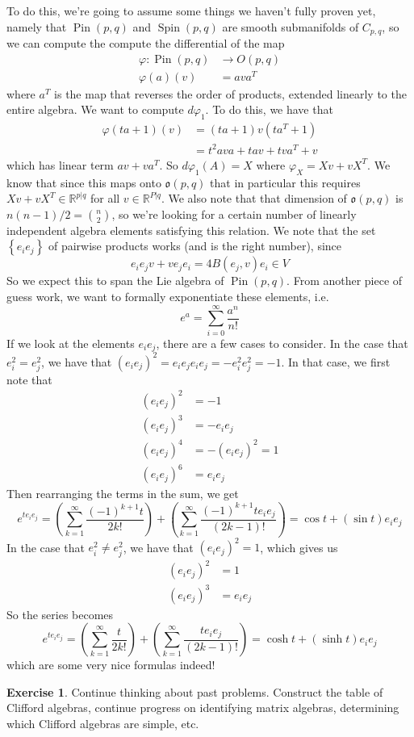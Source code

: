 \documentclass[psamsfonts]{amsart}
\theoremstyle{definition}
\newtheorem{exer}[thm]{Exercise}
\theoremstyle{remark}
\newcommand{\R}{\mathbb{R}}
\newcommand{\set}[1]{\left\lbrace #1 \right\rbrace}
\DeclareMathOperator{\Pin}{Pin}
\DeclareMathOperator{\Spin}{Spin}
\begin{document}
To do this, we're going to assume some things we haven't fully proven yet, namely that $\Pin(p,q)$ and $\Spin(p,q)$ are smooth submanifolds of $C_{p,q}$, so we can compute the compute the differential of the map
\begin{align*}
\varphi : \Pin(p,q) &\to O(p,q) \\
\varphi(a)(v) &= ava^T
\end{align*}
where $a^T$ is the map that reverses the order of products, extended linearly to the entire algebra. We want to compute $d\varphi_1$. To do this, we have that 
\begin{align*}
\varphi(ta + 1)(v) &= (ta + 1)v(ta^T + 1) \\
&= t^2ava + tav + tva^T + v
\end{align*}
which has linear term $av + va^T$. So $d\varphi_1(A) = X$ where $\varphi_X = Xv+  vX^T$. We know that since this maps onto $\mathfrak{o}(p,q)$ that in particular this requires $Xv + vX^T \in \R^{p|q}$ for all $v \in \R^{P|q}$. We also note that that dimension of $\mathfrak{o}(p,q)$ is $n(n-1)/2 = \binom{n}{2}$, so we're looking for a certain number of linearly independent algebra elements satisfying this relation. We note that the set $\set{e_ie_j}$ of pairwise products works (and is the right number), since 
$$e_ie_jv + ve_je_i = 4B(e_j,v)e_i \in V$$
So we expect this to span the Lie algebra of $\Pin(p,q)$. From another piece of guess work, we want to formally exponentiate these elements, i.e. 
$$e^a = \sum_{i = 0}^\infty \frac{a^n}{n!} $$
If we look at the elements $e_ie_j$, there are a few cases to consider. In the case that $e_i^2 = e_j^2$, we have that $(e_ie_j)^2 = e_ie_je_ie_j = -e_i^2e_j^2 = -1$. In that case, we first note that 
\begin{align*}
(e_ie_j)^2  &= -1 \\
(e_ie_j)^3 &= -e_ie_j \\
(e_ie_j)^4 &= -(e_ie_j)^2 = 1 \\
(e_ie_j)^6 &= e_ie_j
\end{align*}
Then rearranging the terms in the sum, we get 
$$e^{te_ie_j} = \left(\sum_{k = 1}^\infty \frac{(-1)^{k+1}t}{2k !} \right) + \left(\sum_{k = 1}^\infty \frac{(-1)^{k+1}te_ie_j}{(2k-1)!} \right) = \cos t + (\sin t) e_ie_j$$
In the case that $e_i^2 \neq e_j^2$, we have that $(e_ie_j)^2 = 1$, which gives us
\begin{align*}
(e_ie_j)^2 &= 1 \\
(e_ie_j)^3 &= e_ie_j
\end{align*}
So the series becomes
$$e^{te_ie_j} = \left( \sum_{k=1}^\infty \frac{t}{2k !} \right)  + \left( \sum_{k = 1}^\infty \frac{te_ie_j}{(2k - 1)!}\right) = \cosh t + (\sinh t)e_ie_j$$
which are some very nice formulas indeed!
%
\begin{exer}
Continue thinking about past problems. Construct the table of Clifford algebras, continue progress on identifying matrix algebras, determining which Clifford algebras are simple, etc.
\end{exer}
%
\setcounter{section}{8}
%
\setcounter{thm}{0}
\end{document}
